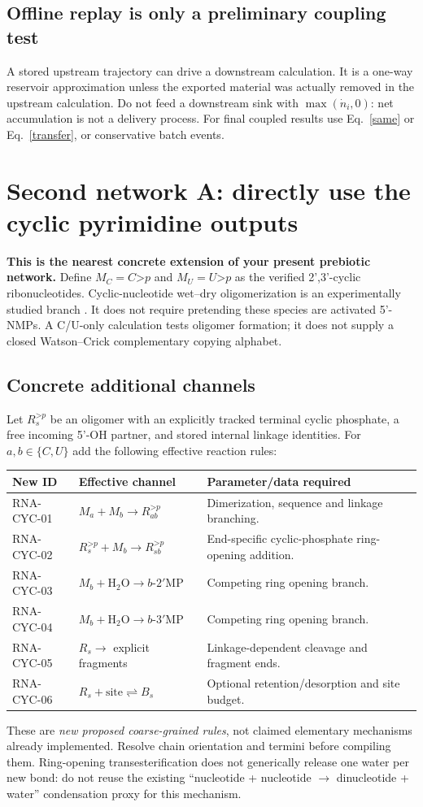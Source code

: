 \documentclass[11pt]{article}
\newcommand{\cp}{\mathord{>}p}
\begin{document}
\subsection{Offline replay is only a preliminary coupling test}
A stored upstream trajectory can drive a downstream calculation. It is a
one-way reservoir approximation unless the exported material was actually
removed in the upstream calculation. Do not feed a downstream sink with
$\max(\dot n_i,0)$: net accumulation is not a delivery process. For final coupled
results use Eq.~\eqref{same} or Eq.~\eqref{transfer}, or conservative batch events.

\clearpage
\section{Second network A: directly use the cyclic pyrimidine outputs}
\textbf{This is the nearest concrete extension of your present prebiotic network.}
Define $M_C=C\cp$ and $M_U=U\cp$ as the verified 2',3'-cyclic ribonucleotides.
Cyclic-nucleotide wet--dry oligomerization is an experimentally studied branch
\cite{dass,cyclic}. It does not require pretending these species are activated
5'-NMPs. A C/U-only calculation tests oligomer formation; it does not supply a
closed Watson--Crick complementary copying alphabet.

\subsection{Concrete additional channels}
Let $R_s^{\cp}$ be an oligomer with an explicitly tracked terminal cyclic
phosphate, a free incoming 5'-OH partner, and stored internal linkage identities.
For $a,b\in\{C,U\}$ add the following effective reaction rules:
\begin{longtable}{p{}p{}p{}}
\toprule
New ID & Effective channel & Parameter/data required \\
\midrule
RNA-CYC-01 & $M_a+M_b\to R_{ab}^{\cp}$ & Dimerization, sequence and linkage branching. \\
RNA-CYC-02 & $R_s^{\cp}+M_b\to R_{sb}^{\cp}$ & End-specific cyclic-phosphate ring-opening addition. \\
RNA-CYC-03 & $M_b+\mathrm{H_2O}\to b\text{-}2'\mathrm{MP}$ & Competing ring opening branch. \\
RNA-CYC-04 & $M_b+\mathrm{H_2O}\to b\text{-}3'\mathrm{MP}$ & Competing ring opening branch. \\
RNA-CYC-05 & $R_s\to$ explicit fragments & Linkage-dependent cleavage and fragment ends. \\
RNA-CYC-06 & $R_s+\mathrm{site}\rightleftharpoons B_s$ & Optional retention/desorption and site budget. \\
\bottomrule
\end{longtable}
These are \emph{new proposed coarse-grained rules}, not claimed elementary
mechanisms already implemented. Resolve chain orientation and termini before
compiling them. Ring-opening transesterification does not generically release
one water per new bond: do not reuse the existing ``nucleotide + nucleotide
$\to$ dinucleotide + water'' condensation proxy for this mechanism.
\end{document}
